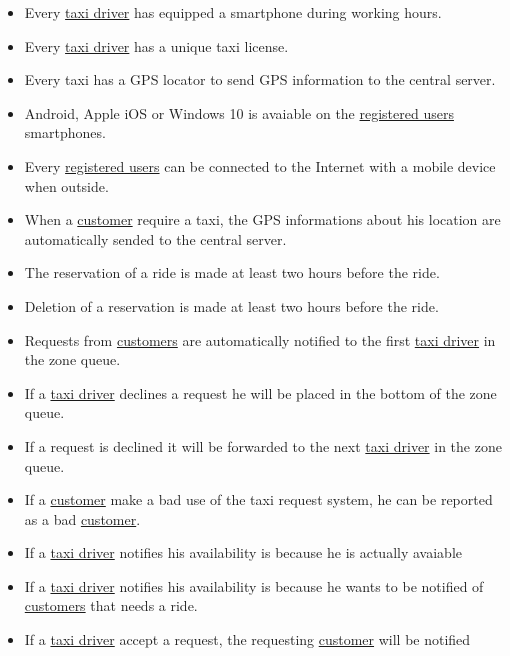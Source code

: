 \documentclass{report}
\begin{document}
			\begin{itemize}
				\item Every \hyperref[sec:tdriver]{taxi driver} has equipped a smartphone during working hours.

				\item Every \hyperref[sec:tdriver]{taxi driver} has a unique taxi license.

				\item Every taxi has a GPS locator to send GPS information to the central server.

				\item Android, Apple iOS or Windows 10 is avaiable on the \hyperref[sec:ruser]{registered users} smartphones.

				\item Every \hyperref[sec:ruser]{registered users} can be connected to the Internet with a mobile device when outside.

				\item When a \hyperref[sec:customer]{customer} require a taxi, the GPS informations about his location are automatically sended to the central server.

				\item The reservation of a ride is made at least two hours before the ride.

				\item Deletion of a reservation is made at least two hours before the ride.

				\item Requests from \hyperref[sec:customer]{customers} are automatically notified to the first \hyperref[sec:tdriver]{taxi driver} in the zone queue.

				\item If a \hyperref[sec:tdriver]{taxi driver} declines a request he will be placed in the bottom of the zone queue.

				\item If a request is declined it will be forwarded to the next \hyperref[sec:tdriver]{taxi driver} in the zone queue.

				\item If a \hyperref[sec:customer]{customer} make a bad use of the taxi request system, he can be reported as a bad \hyperref[sec:customer]{customer}.

				\item If a \hyperref[sec:tdriver]{taxi driver} notifies his availability is because he is actually avaiable

				\item If a \hyperref[sec:tdriver]{taxi driver} notifies his availability is because he wants to be notified of \hyperref[sec:customer]{customers} that needs a ride.

				\item If a \hyperref[sec:tdriver]{taxi driver} accept a request, the requesting \hyperref[sec:customer]{customer} will be notified
			\end{itemize}
\end{document}
